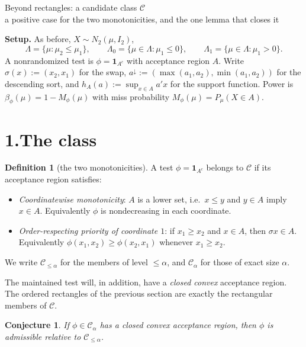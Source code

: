 \documentclass[12pt]{article}
\newtheorem{conjecture}{Conjecture}
\theoremstyle{definition}
\newtheorem{definition}{Definition}
\theoremstyle{remark}
\newcommand{\Lam}{\Lambda}
\newcommand{\Cclass}{\mathcal C}
\newcommand{\sortdown}{{\downarrow}}
\begin{document}
\begin{center}
{\LARGE Beyond rectangles: a candidate class $\Cclass$}\\[2pt]
{\small a positive case for the two monotonicities, and the one lemma that closes it}
\end{center}

\medskip

\noindent\textbf{Setup.} As before, $X\sim N_2(\mu,I_2)$,
\[
\Lam=\{\mu:\mu_2\le\mu_1\},\qquad
\Lam_0=\{\mu\in\Lam:\mu_1\le0\},\qquad
\Lam_1=\{\mu\in\Lam:\mu_1>0\}.
\]
A nonrandomized test is $\phi=\mathbf 1_{A^c}$ with acceptance region $A$. Write $\sigma(x):=(x_2,x_1)$ for the swap, $a^{\sortdown}:=(\max(a_1,a_2),\min(a_1,a_2))$ for the descending sort, and $h_A(a):=\sup_{x\in A}a'x$ for the support function. Power is $\beta_\phi(\mu)=1-M_\phi(\mu)$ with miss probability $M_\phi(\mu)=P_\mu(X\in A)$.

\section*{1.\quad The class}

\begin{definition}[the two monotonicities]
A test $\phi=\mathbf 1_{A^c}$ belongs to $\Cclass$ if its acceptance region satisfies:
\begin{itemize}[leftmargin=2.2em]
\item[\textbf{(M1)}] \emph{Coordinatewise monotonicity}: $A$ is a lower set, i.e.\ $x\le y$ and $y\in A$ imply $x\in A$. Equivalently $\phi$ is nondecreasing in each coordinate.
\item[\textbf{(M2)}] \emph{Order-respecting priority of coordinate $1$}: if $x_1\ge x_2$ and $x\in A$, then $\sigma x\in A$. Equivalently $\phi(x_1,x_2)\ge\phi(x_2,x_1)$ whenever $x_1\ge x_2$.
\end{itemize}
We write $\Cclass_{\le\alpha}$ for the members of level $\le\alpha$, and $\Cclass_\alpha$ for those of exact size $\alpha$.
\end{definition}

The maintained test will, in addition, have a \emph{closed convex} acceptance region. The ordered rectangles of the previous section are exactly the rectangular members of $\Cclass$.

\begin{conjecture}\label{conj:main}
If $\phi\in\Cclass_\alpha$ has a closed convex acceptance region, then $\phi$ is admissible relative to $\Cclass_{\le\alpha}$.
\end{conjecture}
\end{document}

